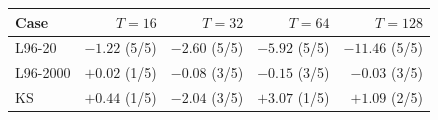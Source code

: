 \begin{tabular}{lrrrr}
\toprule
Case & $T=16$ & $T=32$ & $T=64$ & $T=128$\\
\midrule
L96-20 & $-1.22$ (5/5) & $-2.60$ (5/5) & $-5.92$ (5/5) & $-11.46$ (5/5)\\
L96-2000 & $+0.02$ (1/5) & $-0.08$ (3/5) & $-0.15$ (3/5) & $-0.03$ (3/5)\\
KS & $+0.44$ (1/5) & $-2.04$ (3/5) & $+3.07$ (1/5) & $+1.09$ (2/5)\\
\bottomrule
\end{tabular}
